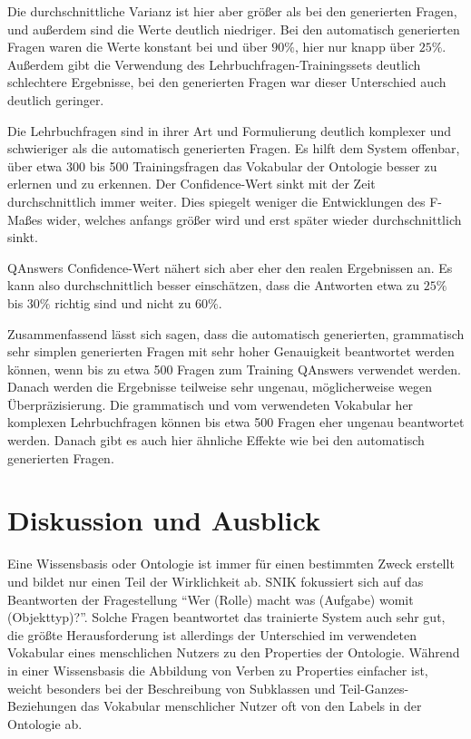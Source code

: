 \documentclass[utf8,biblatex]{lni}
\begin{document}
Die durchschnittliche Varianz ist hier aber größer als bei den generierten Fragen, und außerdem sind die Werte deutlich niedriger.
Bei den automatisch generierten Fragen waren die Werte konstant bei und über $90\%$, hier nur knapp über $25\%$.
Außerdem gibt die Verwendung des Lehrbuchfragen-Trainingssets deutlich schlechtere Ergebnisse, bei den generierten Fragen war dieser Unterschied auch deutlich geringer.

Die Lehrbuchfragen sind in ihrer Art und Formulierung deutlich komplexer und schwieriger als die automatisch generierten Fragen.
Es hilft dem System offenbar, über etwa 300 bis 500 Trainingsfragen das Vokabular der Ontologie besser zu erlernen und zu erkennen.
Der Confidence-Wert sinkt mit  der Zeit durchschnittlich immer weiter.
Dies spiegelt weniger die Entwicklungen des F-Maßes wider, welches anfangs größer wird und erst später wieder durchschnittlich sinkt.

QAnswers Confidence-Wert nähert sich aber eher den realen Ergebnissen an.
Es kann also durchschnittlich besser einschätzen, dass die Antworten etwa zu $25\%$ bis $30\%$ richtig sind und nicht zu $60\%$.

Zusammenfassend lässt sich sagen, dass die automatisch generierten, grammatisch sehr simplen generierten Fragen mit sehr hoher Genauigkeit beantwortet werden können,
wenn bis zu etwa 500 Fragen zum Training QAnswers verwendet werden.
Danach werden die Ergebnisse teilweise sehr ungenau, möglicherweise wegen Überpräzisierung.
Die grammatisch und vom verwendeten Vokabular her komplexen Lehrbuchfragen können bis etwa 500 Fragen eher ungenau beantwortet werden.
Danach gibt es auch hier ähnliche Effekte wie bei den automatisch generierten Fragen.

\section{Diskussion und Ausblick}

Eine Wissensbasis oder Ontologie ist immer für einen bestimmten Zweck erstellt und bildet nur einen Teil der Wirklichkeit ab.
SNIK fokussiert sich auf das Beantworten der Fragestellung \enquote{Wer (Rolle) macht was (Aufgabe) womit (Objekttyp)?}.
Solche Fragen beantwortet das trainierte System auch sehr gut, die größte Herausforderung ist allerdings der Unterschied im verwendeten Vokabular eines menschlichen Nutzers zu den Properties der Ontologie.
Während in einer Wissensbasis die Abbildung von Verben zu Properties einfacher ist, weicht besonders bei der Beschreibung von Subklassen und Teil-Ganzes-Beziehungen das Vokabular menschlicher Nutzer oft von den Labels in der Ontologie ab.
\end{document}
